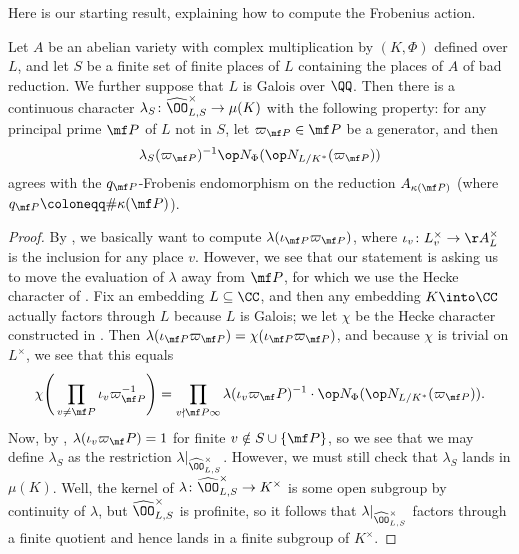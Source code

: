 \documentclass[../thesis.tex]{subfiles}
\begin{document}

Here is our starting result, explaining how to compute the Frobenius action.
\begin{proposition} \label{prop:fundamental-compute-frob}
	Let $A$ be an abelian variety with complex multiplication by $(K,\Phi)$ defined over $L$, and let $S$ be a finite set of finite places of $L$ containing the places of $A$ of bad reduction. We further suppose that $L$ is Galois over $\QQ$. Then there is a continuous character $\lambda_S\colon\widehat\OO_{L,S}^\times\to\mu(K)$ with the following property: for any principal prime $\mf P$ of $L$ not in $S$, let $\varpi_{\mf P}\in\mf P$ be a generator, and then
	\[\lambda_S(\varpi_{\mf P})^{-1}\op N_\Phi(\op N_{L/K^*}(\varpi_{\mf P}))\]
	agrees with the $q_{\mf P}$-Frobenis endomorphism on the reduction $A_{\kappa(\mf P)}$ (where $q_{\mf P}\coloneqq\#\kappa(\mf P)$).
\end{proposition}
\begin{proof}
	By , we basically want to compute $\lambda(\iota_{\mf P}\varpi_{\mf P})$, where $\iota_v\colon L_v^\times\to\AA_L^\times$ is the inclusion for any place $v$. However, we see that our statement is asking us to move the evaluation of $\lambda$ away from $\mf P$, for which we use the Hecke character of . Fix an embedding $L\subseteq\CC$, and then any embedding $K\into\CC$ actually factors through $L$ because $L$ is Galois; we let $\chi$ be the Hecke character constructed in . Then $\lambda(\iota_{\mf P}\varpi_{\mf P})=\chi(\iota_{\mf P}\varpi_{\mf P})$, and because $\chi$ is trivial on $L^\times$, we see that this equals
	\[\chi\Bigg(\prod_{v\ne\mf P}\iota_v\varpi_{\mf P}^{-1}\Bigg)=\prod_{v\nmid\mf P\infty}\lambda(\iota_v\varpi_\mf P)^{-1}\cdot\op N_\Phi(\op N_{L/K^*}(\varpi_{\mf P})).\]
	Now, by , $\lambda(\iota_v\varpi_\mf P)=1$ for finite $v\notin S\cup\{\mf P\}$, so we see that we may define $\lambda_S$ as the restriction $\lambda|_{\widehat\OO_{L,S}^\times}$. However, we must still check that $\lambda_S$ lands in $\mu(K)$. Well, the kernel of $\lambda\colon\widehat\OO_{L,S}^\times\to K^\times$ is some open subgroup by continuity of $\lambda$, but $\widehat\OO_{L,S}^\times$ is profinite, so it follows that $\lambda|_{\widehat\OO_{L,S}^\times}$ factors through a finite quotient and hence lands in a finite subgroup of $K^\times$.
\end{proof}
\end{document}
